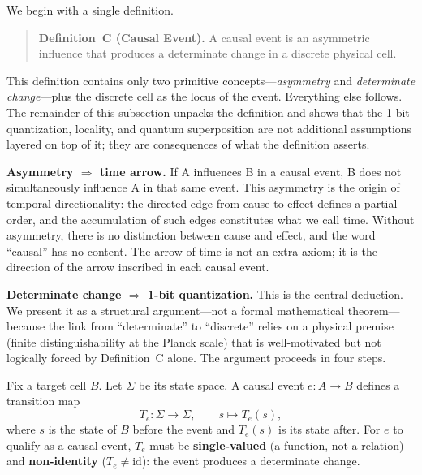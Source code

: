 \documentclass[aps,prd,twocolumn,showpacs,superscriptaddress,preprintnumbers]{revtex4-2}
\begin{document}
We begin with a single definition.

\begin{quote}
\textbf{Definition~C (Causal Event).} A causal event is an asymmetric influence that produces a determinate change in a discrete physical cell.
\end{quote}

This definition contains only two primitive concepts---\emph{asymmetry} and \emph{determinate change}---plus the discrete cell as the locus of the event. Everything else follows. The remainder of this subsection unpacks the definition and shows that the 1-bit quantization, locality, and quantum superposition are not additional assumptions layered on top of it; they are consequences of what the definition asserts.

\textbf{Asymmetry $\Rightarrow$ time arrow.}
If A influences B in a causal event, B does not simultaneously influence A in that same event. This asymmetry is the origin of temporal directionality: the directed edge from cause to effect defines a partial order, and the accumulation of such edges constitutes what we call time. Without asymmetry, there is no distinction between cause and effect, and the word ``causal'' has no content. The arrow of time is not an extra axiom; it is the direction of the arrow inscribed in each causal event.

\textbf{Determinate change $\Rightarrow$ 1-bit quantization.}
This is the central deduction. We present it as a structural argument---not a formal mathematical theorem---because the link from ``determinate'' to ``discrete'' relies on a physical premise (finite distinguishability at the Planck scale) that is well-motivated but not logically forced by Definition~C alone. The argument proceeds in four steps.

Fix a target cell $B$. Let $\Sigma$ be its state space. A causal event $e: A \to B$ defines a transition map
\begin{equation}
T_e: \Sigma \to \Sigma, \qquad s \mapsto T_e(s),
\label{eq:transition}
\end{equation}
where $s$ is the state of $B$ before the event and $T_e(s)$ is its state after. For $e$ to qualify as a causal event, $T_e$ must be \textbf{single-valued} (a function, not a relation) and \textbf{non-identity} ($T_e \neq \mathrm{id}$): the event produces a determinate change.
\end{document}
